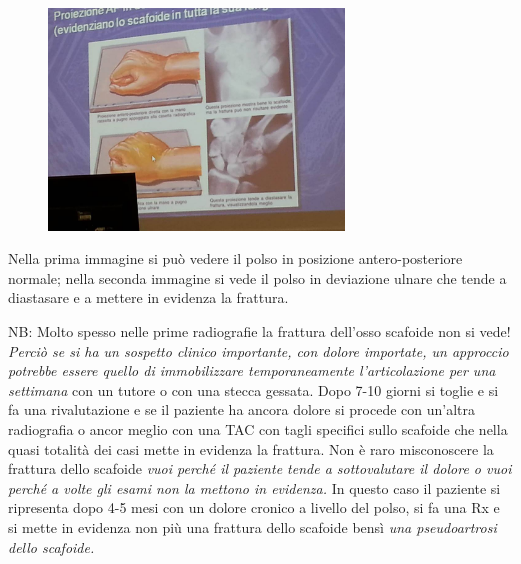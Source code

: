 \begin{figure}[!ht]
\centering
\includegraphics[width=0.7\textwidth]{003/image11.jpeg}
\end{figure}

Nella prima immagine si può vedere il polso in posizione antero-posteriore normale; nella seconda immagine si vede il polso in deviazione ulnare che tende a diastasare e a mettere in evidenza la
frattura.

NB: Molto spesso nelle prime radiografie la frattura dell'osso scafoide non si vede! \emph{Perciò se si ha un sospetto clinico importante, con dolore importate, un approccio potrebbe essere quello di \emph{immobilizzare temporaneamente l'articolazione per una settimana}}
con un tutore o con una stecca gessata. Dopo 7-10 giorni si toglie e si
fa una rivalutazione e se il paziente ha ancora dolore si procede con
un'altra radiografia o ancor meglio con una TAC con tagli specifici
sullo scafoide che nella quasi totalità dei casi mette in evidenza la
frattura. Non è raro misconoscere la frattura dello scafoide \emph{vuoi
perché il paziente tende a sottovalutare il dolore o vuoi perché a volte
gli esami non la mettono in evidenza.} In questo caso il paziente si
ripresenta dopo 4-5 mesi con un dolore cronico a livello del polso, si
fa una Rx e si mette in evidenza non più una frattura dello scafoide
bensì \emph{una pseudoartrosi dello scafoide.}
